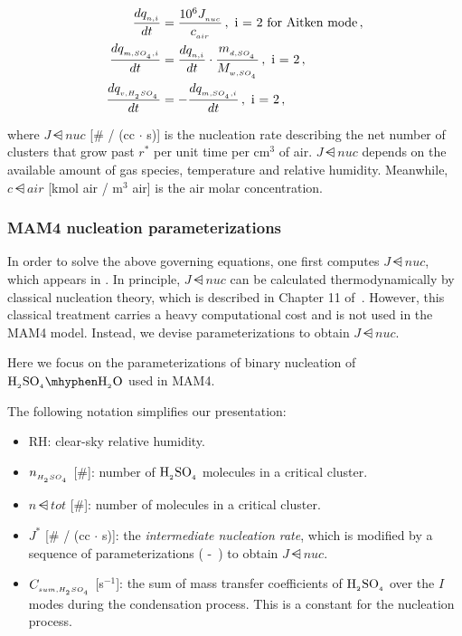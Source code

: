 \begin{align}
  \frac{dq\dsub{n,i}}{dt} &= \frac{10^6 J\dsub{nuc}}{c\dsub{air}} \,, \text{ i = 2 for Aitken mode} \,, \labeleq{nuc:jnuc} \\
  \frac{d\amass{\asf}}{dt} &= \frac{dq\dsub{n,i}}{dt} \cdot \frac{m\dsub{d,\asf}}{\mw{\asf}} \,, \text{ i = 2} \,, \labeleq{nuc:amass} \\
  \frac{d\vmass{\sag}}{dt} &= -\frac{d\amass{\asf}}{dt} \,, \text{ i = 2} \,, \labeleq{nuc:vmass}
\end{align}

where $J\dsub{nuc}$ [\# / (cc $\cdot$ s)] is the nucleation rate describing the
net number of clusters that grow past $r^*$ per unit time per cm$^{3}$ of
air. $J\dsub{nuc}$ depends on the available amount of gas species, temperature
and relative humidity. Meanwhile, $c\dsub{air}$ [kmol air / m$^3$ air] is
the air molar concentration.

\subsubsection{MAM4 nucleation parameterizations} 

In order to solve the above governing equations, one first computes $J\dsub{nuc}$,
which appears in . In principle, $J\dsub{nuc}$ can be calculated
thermodynamically by classical nucleation theory, which is described in
Chapter 11 of~\cite{seinfeld-2006-acp}. However, this classical treatment
carries a heavy computational cost and is not used in the MAM4 model. Instead,
we devise parameterizations to obtain $J\dsub{nuc}$.

Here we focus on the parameterizations of binary nucleation of
$\rsag \mhyphen \rwater$ used in MAM4.

The following notation simplifies our presentation:
\begin{itemize}
  \item RH: clear-sky relative humidity.
  \item $n_{_{H_{_2}SO_{_4}}}$ [\#]: number of $\rm H_{_2}SO_{_4}$ molecules in a critical cluster.
  \item $n\dsub{tot}$ [\#]: number of molecules in a critical cluster.
  \item $J^*$ [\# / (cc $\cdot$ s)]: the {\em intermediate nucleation rate},
        which is modified by a sequence of parameterizations
        ( -~) to
        obtain $J\dsub{nuc}$.
  \item $C_{_{sum,H_{_2}SO_{_4}}}$ [s$^{-1}$]: the sum of mass transfer coefficients of
        $\rm H_{_2}SO_{_4}$ over the $I$ modes during the condensation process. This is a
        constant for the nucleation process.
\end{itemize}


